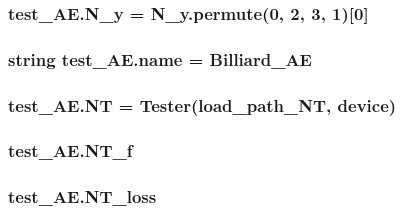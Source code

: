 \subsubsection[{\texorpdfstring{N\+\_\+y}{N_y}}]{\setlength{\rightskip}{0pt plus 5cm}test\+\_\+\+A\+E.\+N\+\_\+y = N\+\_\+y.\+permute(0, 2, 3, 1)\mbox{[}0\mbox{]}}\hypertarget{namespacetest___a_e_a67d37b10531bb1f019d9f59aff77b491}{}\label{namespacetest___a_e_a67d37b10531bb1f019d9f59aff77b491}
\subsubsection[{\texorpdfstring{name}{name}}]{\setlength{\rightskip}{0pt plus 5cm}string test\+\_\+\+A\+E.\+name = \textquotesingle{}Billiard\+\_\+\+AE\textquotesingle{}}\hypertarget{namespacetest___a_e_aedd46085ef062fbdb40666e38f62768b}{}\label{namespacetest___a_e_aedd46085ef062fbdb40666e38f62768b}
\subsubsection[{\texorpdfstring{NT}{NT}}]{\setlength{\rightskip}{0pt plus 5cm}test\+\_\+\+A\+E.\+NT = {\bf Tester}({\bf load\+\_\+path\+\_\+\+NT}, {\bf device})}\hypertarget{namespacetest___a_e_a23bc451321689c0ef6c1a83cd7780e72}{}\label{namespacetest___a_e_a23bc451321689c0ef6c1a83cd7780e72}
\subsubsection[{\texorpdfstring{N\+T\+\_\+f}{NT_f}}]{\setlength{\rightskip}{0pt plus 5cm}test\+\_\+\+A\+E.\+N\+T\+\_\+f}\hypertarget{namespacetest___a_e_af43c23f8d468df9b3e89f7371c371700}{}\label{namespacetest___a_e_af43c23f8d468df9b3e89f7371c371700}
\subsubsection[{\texorpdfstring{N\+T\+\_\+loss}{NT_loss}}]{\setlength{\rightskip}{0pt plus 5cm}test\+\_\+\+A\+E.\+N\+T\+\_\+loss}\hypertarget{namespacetest___a_e_ab31f41095c9255a3c74b902f5d1e4885}{}\label{namespacetest___a_e_ab31f41095c9255a3c74b902f5d1e4885}
